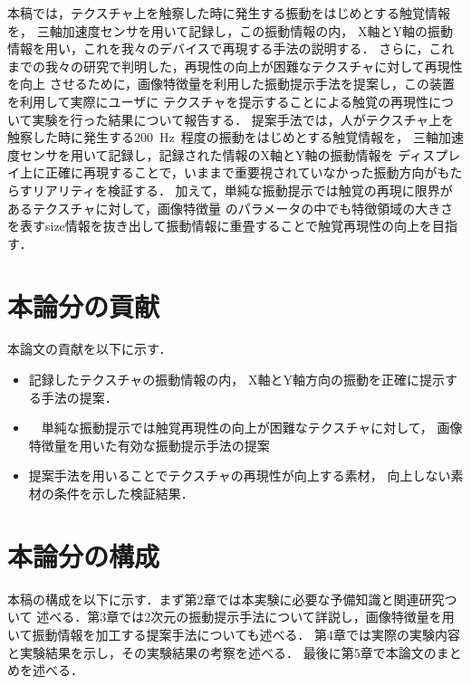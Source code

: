 本稿では，テクスチャ上を触察した時に発生する振動をはじめとする触覚情報を，
三軸加速度センサを用いて記録し，この振動情報の内，
X軸とY軸の振動情報を用い，これを我々のデバイスで再現する手法の説明する．
さらに，これまでの我々の研究で判明した，再現性の向上が困難なテクスチャに対して再現性を向上
させるために，画像特徴量を利用した振動提示手法を提案し，この装置を利用して実際にユーザに
テクスチャを提示することによる触覚の再現性について実験を行った結果について報告する．
提案手法では，人がテクスチャ上を触察した時に発生する200\ Hz\ 程度の振動をはじめとする触覚情報を，
三軸加速度センサを用いて記録し，記録された情報のX軸とY軸の振動情報を
ディスプレイ上に正確に再現することで，いままで重要視されていなかった振動方向がもたらすリアリティを検証する．
加えて，単純な振動提示では触覚の再現に限界があるテクスチャに対して，画像特徴量
のパラメータの中でも特徴領域の大きさを表すsize情報を抜き出して振動情報に重畳することで触覚再現性の向上を目指す．

\section{本論分の貢献}
 本論文の貢献を以下に示す．\par
 \begin{itemize}
   \item 記録したテクスチャの振動情報の内，
   X軸とY軸方向の振動を正確に提示する手法の提案．
   \item　単純な振動提示では触覚再現性の向上が困難なテクスチャに対して，
   画像特徴量を用いた有効な振動提示手法の提案
   \item 提案手法を用いることでテクスチャの再現性が向上する素材，
   向上しない素材の条件を示した検証結果．
　
　
 \end{itemize}

\section{本論分の構成}
 本稿の構成を以下に示す．まず第2章では本実験に必要な予備知識と関連研究ついて
述べる．第3章では2次元の振動提示手法について詳説し，画像特徴量を用いて振動情報を加工する提案手法についても述べる．
第4章では実際の実験内容と実験結果を示し，その実験結果の考察を述べる．
最後に第5章で本論文のまとめを述べる．
